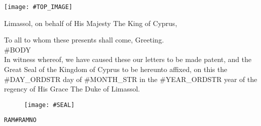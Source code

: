 \documentclass[varwidth=true,border=50pt]{standalone}
\begin{document}
\thispagestyle{fancy}

\noindent \texttt{[image: \#TOP\_IMAGE]}

{\LARGE
Limassol, on behalf of His Majesty The King of Cyprus,

\hspace{20pt} To all to whom these presents shall come, Greeting.\\

\hspace{20pt} #BODY\\

\hspace{20pt} In witness whereof, we have caused these our letters to be made patent, and the Great Seal of the Kingdom of Cyprus to be hereunto affixed, on this the #DAY_ORDSTR day of #MONTH_STR in the #YEAR_ORDSTR year of the regency of His Grace The Duke of Limassol.
}

\begin{figure}[h]
\centering
\texttt{[image: \#SEAL]}
\end{figure}

\hfill {\footnotesize \texttt{RAM{#RAMNO}}}
\end{document}
